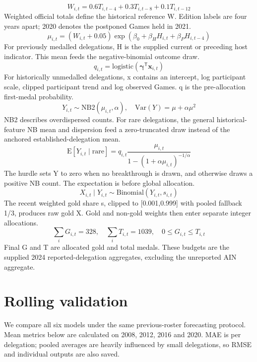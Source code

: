 \documentclass[11pt,a4paper]{article}
\begin{document}
\begin{equation}
W_{i,t}=0.6T_{i,t-4}+0.3T_{i,t-8}+0.1T_{i,t-12}\label{eq:1}
\end{equation}
Weighted official totals define the historical reference W. Edition labels are four years apart; 2020 denotes the postponed Games held in 2021.
\begin{equation}
\mu_{i,t}=(W_{i,t}+0.05)\exp(\beta_0+\beta_H H_{i,t}+\beta_P H_{i,t-4})\label{eq:2}
\end{equation}
For previously medalled delegations, H is the supplied current or preceding host indicator. This mean feeds the negative-binomial outcome draw.
\begin{equation}
q_{i,t}=\mathrm{logistic}(\boldsymbol{\gamma}^{\mathsf{T}}\mathbf{x}_{i,t})\label{eq:3}
\end{equation}
For historically unmedalled delegations, x contains an intercept, log participant scale, clipped participant trend and log observed Games. q is the pre-allocation first-medal probability.
\begin{equation}
Y_{i,t}\sim\mathrm{NB2}(\mu_{i,t},\alpha),\quad\mathrm{Var}(Y)=\mu+\alpha\mu^2\label{eq:4}
\end{equation}
NB2 describes overdispersed counts. For rare delegations, the general historical-feature NB mean and dispersion feed a zero-truncated draw instead of the anchored established-delegation mean.
\begin{equation}
\mathrm{E}[Y_{i,t}\mid\mathrm{rare}]=q_{i,t}\frac{\mu_{i,t}}{1-(1+\alpha\mu_{i,t})^{-1/\alpha}}\label{eq:5}
\end{equation}
The hurdle sets Y to zero when no breakthrough is drawn, and otherwise draws a positive NB count. The expectation is before global allocation.
\begin{equation}
X_{i,t}\mid Y_{i,t}\sim\mathrm{Binomial}(Y_{i,t},s_{i,t})\label{eq:6}
\end{equation}
The recent weighted gold share s, clipped to [0.001,0.999] with pooled fallback 1/3, produces raw gold X. Gold and non-gold weights then enter separate integer allocations.
\begin{equation}
\sum_i G_{i,t}=328,\quad\sum_i T_{i,t}=1039,\quad0\leq G_{i,t}\leq T_{i,t}\label{eq:7}
\end{equation}
Final G and T are allocated gold and total medals. These budgets are the supplied 2024 reported-delegation aggregates, excluding the unreported AIN aggregate.
\section{Rolling validation}
We compare all six models under the same previous-roster forecasting protocol. Mean metrics below are calculated on 2008, 2012, 2016 and 2020. MAE is per delegation; pooled averages are heavily influenced by small delegations, so RMSE and individual outputs are also saved.
\end{document}
